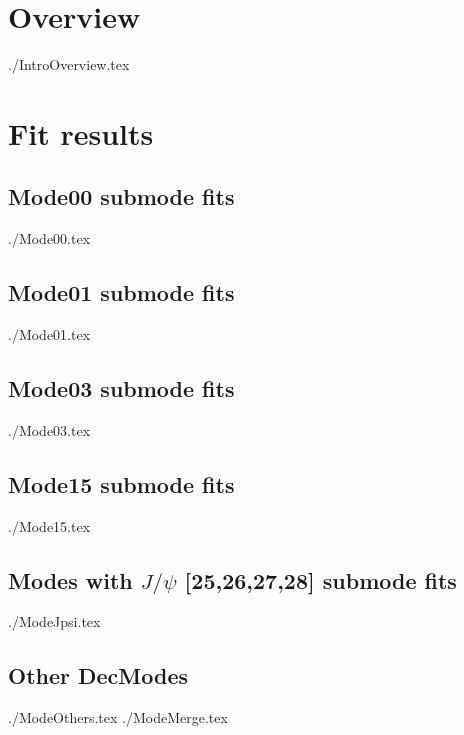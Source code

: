 \documentclass{article}
\begin{document}
\tableofcontents
\newpage
\section{Overview}
{./IntroOverview.tex}
\newpage
\section{Fit results}
\subsection{Mode00 submode fits}
{./Mode00.tex}
\newpage
\subsection{Mode01 submode fits}
{./Mode01.tex}
\newpage
\subsection{Mode03 submode fits}
{./Mode03.tex}
\newpage
\subsection{Mode15 submode fits}
{./Mode15.tex}
\newpage
\subsection{Modes with $J/\psi$ [25,26,27,28] submode fits}
{./ModeJpsi.tex}
\newpage
\subsection{Other DecModes}
{./ModeOthers.tex}
\newpage
{./ModeMerge.tex}
\end{document}
